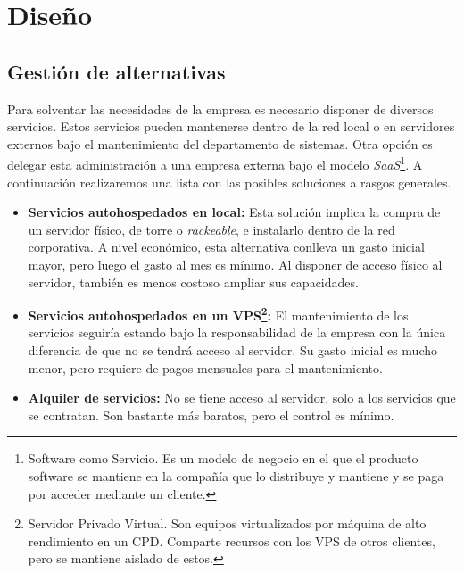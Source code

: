 \chapter{Diseño}
\section{Gestión de alternativas}
Para solventar las necesidades de la empresa es necesario disponer de diversos servicios. Estos servicios pueden mantenerse dentro de la red local o en servidores externos bajo el mantenimiento del departamento de sistemas. Otra opción es delegar esta administración a una empresa externa bajo el modelo \textit{SaaS}\footnote{Software como Servicio. Es un modelo de negocio en el que el producto software se mantiene en la compañía que lo distribuye y mantiene y se paga por acceder mediante un cliente.}. A continuación realizaremos una lista con las posibles soluciones a rasgos generales.
\begin{itemize}
\item \textbf{Servicios autohospedados en local:} Esta solución implica la compra de un servidor físico, de torre o \textit{rackeable}, e instalarlo dentro de la red corporativa. A nivel económico, esta alternativa conlleva un gasto inicial mayor, pero luego el gasto al mes es mínimo. Al disponer de acceso físico al servidor, también es menos costoso ampliar sus capacidades.
\item \textbf{Servicios autohospedados en un VPS\footnote{Servidor Privado Virtual. Son equipos virtualizados por máquina de alto rendimiento en un CPD. Comparte recursos con los VPS de otros clientes, pero se mantiene aislado de estos.}:} El mantenimiento de los servicios seguiría estando bajo la responsabilidad de la empresa con la única diferencia de que no se tendrá acceso al servidor. Su gasto inicial es mucho menor, pero requiere de pagos mensuales para el mantenimiento.
\item \textbf{Alquiler de servicios:} No se tiene acceso al servidor, solo a los servicios que se contratan. Son bastante más baratos, pero el control es mínimo.
\end{itemize}
